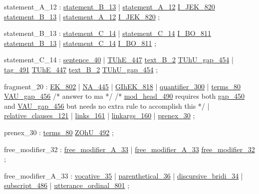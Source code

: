 \label{html:y12}
statement_A_12          :  \hyperref[html:y13]{statement_B_13}
                        |  \hyperref[html:y12]{statement_A_12}  \hyperref[html:y820]{I_JEK_820}  \hyperref[html:y13]{statement_B_13}
                        |  \hyperref[html:y12]{statement_A_12}  \hyperref[html:y820]{I_JEK_820} 
                        ;

\label{html:y13}
statement_B_13          :  \hyperref[html:y14]{statement_C_14}
                        |  \hyperref[html:y14]{statement_C_14}  \hyperref[html:y811]{I_BO_811}  \hyperref[html:y13]{statement_B_13}
                        |  \hyperref[html:y14]{statement_C_14}  \hyperref[html:y811]{I_BO_811} 
                        ;

\label{html:y14}
statement_C_14          :  \hyperref[html:y40]{sentence_40}
                        |  \hyperref[html:y447]{TUhE_447}  \hyperref[html:y2]{text_B_2}  \hyperref[html:y454]{TUhU_gap_454}
                        |  \hyperref[html:y491]{tag_491}  \hyperref[html:y447]{TUhE_447}  \hyperref[html:y2]{text_B_2}  \hyperref[html:y454]{TUhU_gap_454}
                        ;

\label{html:y20}
fragment_20             :  \hyperref[html:y802]{EK_802}
                        |  \hyperref[html:y445]{NA_445}
                        |  \hyperref[html:y818]{GIhEK_818}
                        |  \hyperref[html:y300]{quantifier_300}
                        |  \hyperref[html:y80]{terms_80}  \hyperref[html:y456]{VAU_gap_456}        /* answer to ma */
                        /* \hyperref[html:y490]{mod_head_490} requires both \hyperref[html:y450]{gap_450} and \hyperref[html:y456]{VAU_gap_456}
                           but needs no extra rule to accomplish this */
                        |  \hyperref[html:y121]{relative_clauses_121}
                        |  \hyperref[html:y161]{links_161}
                        |  \hyperref[html:y160]{linkargs_160}
                        |  \hyperref[html:y30]{prenex_30}
                        ;

\label{html:y30}
prenex_30               :  \hyperref[html:y80]{terms_80}  \hyperref[html:y492]{ZOhU_492}
                        ;

\label{html:y32}
free_modifier_32        :  \hyperref[html:y33]{free_modifier_A_33}
                        |  \hyperref[html:y33]{free_modifier_A_33}  \hyperref[html:y32]{free_modifier_32}
                        ;

\label{html:y33}
free_modifier_A_33      :  \hyperref[html:y35]{vocative_35}
                        |  \hyperref[html:y36]{parenthetical_36}
                        |  \hyperref[html:y34]{discursive_bridi_34}
                        |  \hyperref[html:y486]{subscript_486}
                        |  \hyperref[html:y801]{utterance_ordinal_801}
                        ;

